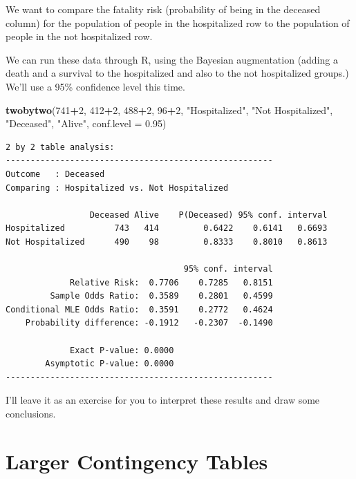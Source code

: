 \documentclass[
]{book}
\newenvironment{Shaded}{\begin{snugshade}}{\end{snugshade}}
\newcommand{\DataTypeTok}[1]{\textcolor[rgb]{0.13,0.29,0.53}{#1}}
\newcommand{\DecValTok}[1]{\textcolor[rgb]{0.00,0.00,0.81}{#1}}
\newcommand{\FloatTok}[1]{\textcolor[rgb]{0.00,0.00,0.81}{#1}}
\newcommand{\KeywordTok}[1]{\textcolor[rgb]{0.13,0.29,0.53}{\textbf{#1}}}
\newcommand{\NormalTok}[1]{#1}
\newcommand{\OperatorTok}[1]{\textcolor[rgb]{0.81,0.36,0.00}{\textbf{#1}}}
\newcommand{\StringTok}[1]{\textcolor[rgb]{0.31,0.60,0.02}{#1}}
\begin{document}
We want to compare the fatality risk (probability of being in the deceased column) for the population of people in the hospitalized row to the population of people in the not hospitalized row.

We can run these data through R, using the Bayesian augmentation (adding a death and a survival to the hospitalized and also to the not hospitalized groups.) We'll use a 95\% confidence level this time.

\begin{Shaded}
\begin{Highlighting}[]
\KeywordTok{twobytwo}\NormalTok{(}\DecValTok{741}\OperatorTok{+}\DecValTok{2}\NormalTok{, }\DecValTok{412}\OperatorTok{+}\DecValTok{2}\NormalTok{, }\DecValTok{488}\OperatorTok{+}\DecValTok{2}\NormalTok{, }\DecValTok{96}\OperatorTok{+}\DecValTok{2}\NormalTok{, }
         \StringTok{"Hospitalized"}\NormalTok{, }\StringTok{"Not Hospitalized"}\NormalTok{, }\StringTok{"Deceased"}\NormalTok{, }\StringTok{"Alive"}\NormalTok{,}
         \DataTypeTok{conf.level =} \FloatTok{0.95}\NormalTok{)}
\end{Highlighting}
\end{Shaded}

\begin{verbatim}
2 by 2 table analysis: 
------------------------------------------------------ 
Outcome   : Deceased 
Comparing : Hospitalized vs. Not Hospitalized 

                 Deceased Alive    P(Deceased) 95% conf. interval
Hospitalized          743   414         0.6422    0.6141   0.6693
Not Hospitalized      490    98         0.8333    0.8010   0.8613

                                    95% conf. interval
             Relative Risk:  0.7706    0.7285   0.8151
         Sample Odds Ratio:  0.3589    0.2801   0.4599
Conditional MLE Odds Ratio:  0.3591    0.2772   0.4624
    Probability difference: -0.1912   -0.2307  -0.1490

             Exact P-value: 0.0000 
        Asymptotic P-value: 0.0000 
------------------------------------------------------
\end{verbatim}

I'll leave it as an exercise for you to interpret these results and draw some conclusions.

\hypertarget{larger-contingency-tables}{%
\chapter{Larger Contingency Tables}\label{larger-contingency-tables}}
\end{document}
